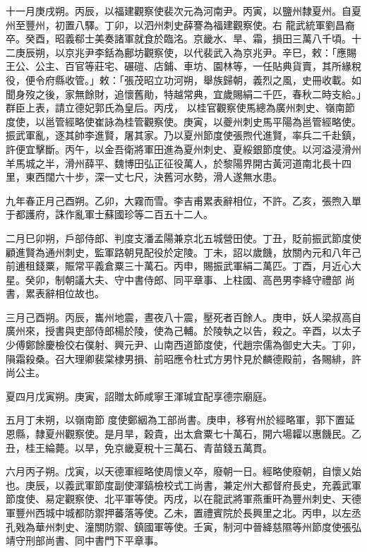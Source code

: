 \begin{pinyinscope}
 十一月庚戌朔。丙辰，以福建觀察使裴次元為河南尹。丙寅，以鹽州隸夏州。自夏州至豐州，初置八驛。丁卯，以泗州刺史薛謇為福建觀察使。右
 龍武統軍劉昌裔卒。癸酉，昭義郗士美奏諸軍就食於臨洺。京畿水、旱、霜，損田三萬八千頃。十二庚辰朔，以京兆尹李銛為鄜坊觀察使，以代裴武入為京兆尹。辛巳，敕：「應賜王公、公主、百官等莊宅、碾磑、店鋪、車坊、園林等，一任貼典貨賣，其所緣稅役，便令府縣收管。」敕：「張茂昭立功河朔，舉族歸朝，義烈之風，史冊收載。如聞身歿之後，家無餘財，追懷舊勛，特越常典，宜歲賜絹二千匹，春秋二時支給。」群臣上表，請立德妃郭氏為皇后。丙戌，
 以桂官觀察使馬總為廣州刺史、嶺南節度使，以邕管經略使崔詠為桂管觀察使。庚寅，以夔州刺史馬平陽為邕管經略使。振武軍亂，逐其帥李進賢，屠其家。乃以夏州節度使張煦代進賢，率兵二千赴鎮，許便宜擊斷。丙午，以金吾衛將軍田進為夏州刺史、夏綏銀節度使。以河溢浸滑州羊馬城之半，滑州薛平、魏博田弘正征役萬人，於黎陽界開古黃河道南北長十四里，東西闊六十步，深一丈七尺，決舊河水勢，滑人遂無水患。



 九年春正月己酉朔。乙卯，大霧而雪。李吉甫累表辭相位，不許。乙亥，張煦入單于都護府，誅作亂軍士蘇國珍等二百五十二人。



 二月巳卯朔，戶部侍郎、判度支潘孟陽兼京北五城營田使。丁丑，貶前振武節度使顧進賢為通州刺史，監軍路朝見配役於定陵。丁未，詔以歲饑，放關內元和八年己前逋租錢粟，賑常平義倉粟三十萬石。丙申，賜振武軍絹二萬匹。丁酉，月近心大星。癸卯，制朝議大夫、守中書侍郎、同平章事、上柱國、高邑男李絳守禮部
 尚書，累表辭相位故也。



 三月己酉朔。丙辰，巂州地震，晝夜八十震，壓死者百餘人。庚申，妖人梁叔高自廣州來，授書與吏部侍郎楊於陵，使為己輔。於陵執之以告，殺之。辛酉，以太子少傅鄭餘慶檢佼右僕射、興元尹、山南西道節度使，代趙宗儒為御史大夫。丁卯，隕霜殺桑。召大理卿裴棠棣男損、前昭應令杜式方男忭見於麟德殿前，各賜緋，許尚公主。



 夏四月戊寅朔。庚寅，詔贈太師咸寧王渾瑊宜配享德宗廟庭。



 五月丁未朔，以嶺南節
 度使鄭絪為工部尚書。庚申，移宥州於經略軍，郭下置延恩縣，隸夏州觀察使。是月旱，穀貴，出太倉粟七十萬石，開六場糶以惠饑民。乙丑，桂王綸薨。以旱，免京畿夏稅十三萬石、青苗錢五萬貫。



 六月丙子朔。戊寅，以天德軍經略使周懷乂卒，廢朝一日。經略使廢朝，自懷乂始也。庚辰，以義武軍節度副使渾鎬檢校式工尚書，兼定州大都督府長史，充義武軍節度使、易定觀察使、北平軍等使。丙戌，以在龍武將軍燕重旰為豐州刺史、天德
 軍豐州西城中城都防禦押蕃落等使。乙未，置禮賓院於長興里之北。丙申，以左丞孔戣為華州刺史、潼關防禦、鎮國軍等使。壬寅，制河中晉絳慈隰等州節度使張弘靖守刑部尚書、同中書門下平章事。




\end{pinyinscope}
